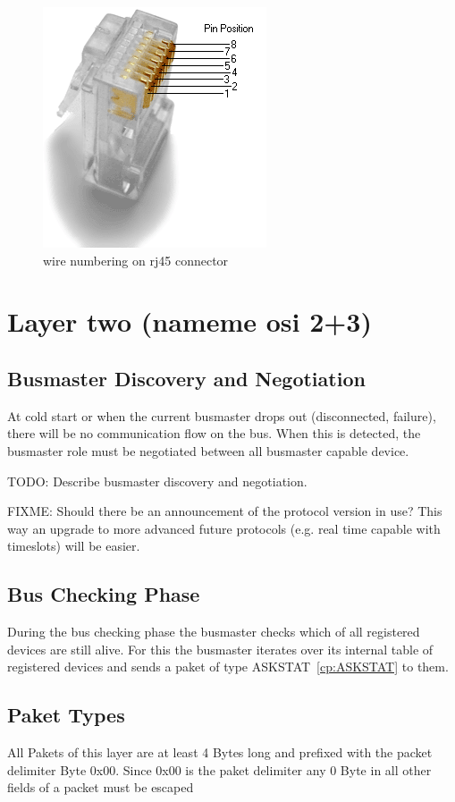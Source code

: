 \documentclass[a4paper,12pt]{scrartcl}
\begin{document}
\begin{figure}
	\centering
	\includegraphics[scale=.7]{png/Rj45plug-8p8c.png}
	\caption{wire numbering on rj45 connector}
	\label{fig:rj45}
\end{figure}

\section{Layer two (nameme osi 2+3)}

\subsection{Busmaster Discovery and Negotiation}
At cold start or when the current busmaster drops out (disconnected, failure), there will be no communication flow on the bus.
When this is detected, the busmaster role must be negotiated between all busmaster capable device.

TODO: Describe busmaster discovery and negotiation.


FIXME: Should there be an announcement of the protocol version in use?
This way an upgrade to more advanced future protocols (e.g. real time capable with timeslots) will be easier.


\subsection{Bus Checking Phase}
During the bus checking phase the busmaster checks which of all registered devices are still alive. For this the busmaster iterates over its internal table of registered devices and sends a paket of type ASKSTAT~\ref{cp:ASKSTAT} to them.

\subsection{Paket Types}
All Pakets of this layer are at least 4 Bytes long and prefixed with the packet delimiter Byte 0x00. 
Since 0x00 is the paket delimiter any 0 Byte in all other fields of a packet  must be escaped
\end{document}
